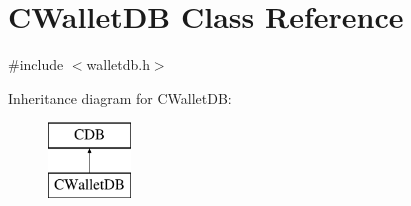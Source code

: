 \hypertarget{class_c_wallet_d_b}{}\section{C\+Wallet\+D\+B Class Reference}
\label{class_c_wallet_d_b}


{\ttfamily \#include $<$walletdb.\+h$>$}

Inheritance diagram for C\+Wallet\+D\+B\+:\begin{figure}[H]
\begin{center}
\leavevmode
\includegraphics[height=2.000000cm]{class_c_wallet_d_b}
\end{center}
\end{figure}
